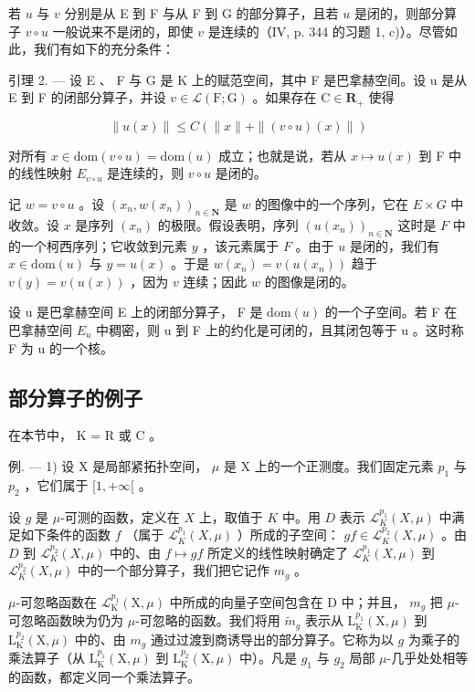 若 \(u\) 与 \(v\) 分别是从 E 到 F 与从 F 到 G 的部分算子，且若 \(u\) 是闭的，则部分算子 \(v \circ u\) 一般说来不是闭的，即使 \(v\) 是连续的（IV, p. 344 的习题 1, c)）。尽管如此，我们有如下的充分条件：

引理 2. --- 设 E 、 F 与 G 是 K 上的赋范空间，其中 F 是巴拿赫空间。设 u 是从 E 到 F 的闭部分算子，并设 \(v \in \mathcal{L}(\mathrm{F};\mathrm{G})\) 。如果存在 \(\mathrm{C} \in \mathbf{R}_{+}\) 使得

\[
\| u (x) \| \leqslant C (\| x \| + \| (v \circ u) (x) \|)
\]

对所有 \(x \in \text{dom}(v \circ u) = \text{dom}(u)\) 成立；也就是说，若从 \(x \mapsto u(x)\) 到 F 中的线性映射 \(E_{v \circ u}\) 是连续的，则 \(v \circ u\) 是闭的。

记 \(w = v \circ u\) 。设 \((x_n, w(x_n))_{n \in \mathbf{N}}\) 是 \(w\) 的图像中的一个序列，它在 \(E \times G\) 中收敛。设 \(x\) 是序列 \((x_n)\) 的极限。假设表明，序列 \((u(x_n))_{n \in \mathbf{N}}\) 这时是 \(F\) 中的一个柯西序列；它收敛到元素 \(y\) ，该元素属于 \(F\) 。由于 \(u\) 是闭的，我们有 \(x \in \text{dom}(u)\) 与 \(y = u(x)\) 。于是 \(w(x_n) = v(u(x_n))\) 趋于 \(v(y) = v(u(x))\) ，因为 \(v\) 连续；因此 \(w\) 的图像是闭的。

设 u 是巴拿赫空间 E 上的闭部分算子， F 是 \(\text{dom}(u)\) 的一个子空间。若 F 在巴拿赫空间 \(E_{u}\) 中稠密，则 u 到 F 上的约化是可闭的，且其闭包等于 u 。这时称 F 为 u 的一个核。

\subsection{部分算子的例子}

在本节中， K = R 或 C 。

例. --- 1) 设 X 是局部紧拓扑空间， \(\mu\) 是 X 上的一个正测度。我们固定元素 \(p_1\) 与 \(p_2\) ，它们属于 \([1, +\infty[\) 。

设 \(g\) 是 \(\mu\)-可测的函数，定义在 \(X\) 上，取值于 \(K\) 中。用 \(D\) 表示 \(\mathcal{L}_{K}^{p_1}(X, \mu)\) 中满足如下条件的函数 \(f\) （属于 \(\mathcal{L}_{K}^{p_1}(X, \mu)\) ）所成的子空间： \(gf \in \mathcal{L}_{K}^{p_2}(X, \mu)\) 。由 \(D\) 到 \(\mathcal{L}_{K}^{p_2}(X, \mu)\) 中的、由 \(f \mapsto gf\) 所定义的线性映射确定了 \(\mathcal{L}_{K}^{p_1}(X, \mu)\) 到 \(\mathcal{L}_{K}^{p_2}(X, \mu)\) 中的一个部分算子，我们把它记作 \(m_g\) 。

\(\mu\)-可忽略函数在 \(\mathcal{L}_{\mathrm{K}}^{p_1}(\mathrm{X},\mu)\) 中所成的向量子空间包含在 D 中；并且， \(m_g\) 把 \(\mu\)-可忽略函数映为仍为 \(\mu\)-可忽略的函数。我们将用 \(\tilde{m}_g\) 表示从 \(\mathrm{L}_{\mathrm{K}}^{p_1}(\mathrm{X},\mu)\) 到 \(\mathrm{L}_{\mathrm{K}}^{p_2}(\mathrm{X},\mu)\) 中的、由 \(m_g\) 通过过渡到商诱导出的部分算子。它称为以 \(g\) 为乘子的乘法算子（从 \(\mathrm{L}_{\mathrm{K}}^{p_1}(\mathrm{X},\mu)\) 到 \(\mathrm{L}_{\mathrm{K}}^{p_2}(\mathrm{X},\mu)\) 中）。凡是 \(g_1\) 与 \(g_2\) 局部 \(\mu\)-几乎处处相等的函数，都定义同一个乘法算子。


